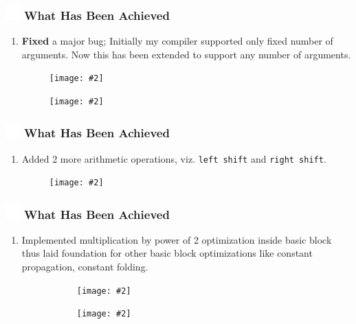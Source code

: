 \documentclass{beamer}
\newcommand{\iph}[2]{
    \texttt{[image: \#2]}
}
\newcommand{\ft}[1]{
  \frametitle{\includegraphics[height=0.55cm, width=0.55cm, keepaspectratio]{assets/tiger.png} #1}
}
\newcounter{saveenumi}
\newcommand{\seti}{\setcounter{saveenumi}{\value{enumi}}}
\newcommand{\conti}{\setcounter{enumi}{\value{saveenumi}}}
\begin{document}
\begin{frame}[fragile]
  \ft{What Has Been Achieved}
  \begin{enumerate}
    \conti
    \item \textbf{Fixed} a major bug; Initially my compiler supported only fixed number of arguments. Now this has been extended to support any number of arguments. 
    \begin{figure}
    \centering
    \iph{0.80}{assets/funargs.png}
    \label{fig:funargs}
    \end{figure}
    \begin{figure}
    \centering
    \iph{0.80}{assets/gitfunargs.png}
    \label{fig:gitfunargs}
    \end{figure}
    \seti
  \end{enumerate}
\end{frame}

\begin{frame}[fragile]
  \ft{What Has Been Achieved}
  \begin{enumerate}
    \conti
    \item Added 2 more arithmetic operations, viz. \texttt{left shift} and \texttt{right shift}. 
    \begin{figure}
    \centering
    \iph{0.80}{assets/shiftoperations.png}
    \label{fig:shiftoperations}
    \end{figure}
    \seti
  \end{enumerate}
\end{frame}

\begin{frame}[fragile]
  \ft{What Has Been Achieved}
  \begin{enumerate}
    \conti
    \item Implemented multiplication by power of 2 optimization inside basic block thus laid foundation for other basic block optimizations like constant propagation, constant folding.
    \begin{figure}[t!]
      \centering
      \begin{subfigure}[t]{\textwidth}
      \centering
      \iph{0.80}{assets/mulopt1.png}
      \label{fig:mulopt1}
      \end{subfigure}
      \begin{subfigure}[t]{0.8\textwidth}
      \centering
      \iph{0.70}{assets/mulopt2.png}
      \label{fig:mulopt2}
      \end{subfigure}
    \end{figure}
    \seti
  \end{enumerate}
\end{frame}
\end{document}
